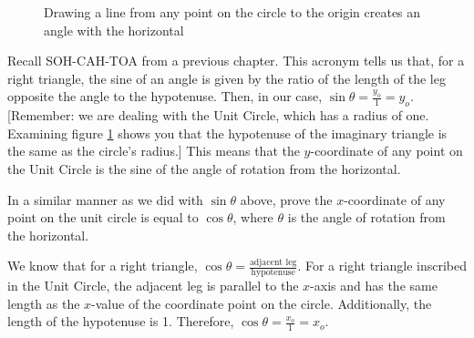 \begin{figure}[htbp]
    \centering
    \caption{Drawing a line from any point on the circle to the origin creates 
    an angle with the horizontal}
    \label{fig:unit_cicle_zoom}
\end{figure}

Recall SOH-CAH-TOA from a previous chapter. This acronym tells us that, for a 
right triangle, the sine of an angle is given by the ratio of the length of the
leg opposite the angle to the hypotenuse. Then, in our case, $\sin{\theta} = 
\frac{y_o}{1} = y_o$. [Remember: we are dealing with the Unit Circle, which has
a radius of one. Examining figure \ref{fig:unit_cicle_zoom} shows you that the 
hypotenuse of the imaginary triangle is the same as the circle's radius.] This 
means that the $y$-coordinate of any point on the Unit Circle is the sine of 
the angle of rotation from the horizontal. 

\begin{Exercise}[label = sine]
In a similar manner as we did with $\sin{\theta}$ above, prove the 
$x$-coordinate of any point on the unit circle is equal to $\cos{\theta}$, 
where $\theta$ is the angle of rotation from the horizontal. 
\vspace{20mm}
\end{Exercise}

\begin{Answer}[ref = sine]
We know that for a right triangle, $\cos{\theta} = \frac{\text{adjacent leg}}{
\text{hypotenuse}}$. For a right triangle inscribed in the Unit Circle, the 
adjacent leg is parallel to the $x$-axis and has the same length as the 
$x$-value of the coordinate point on the circle. Additionally, the length of 
the hypotenuse is 1. Therefore, $\cos{\theta} = \frac{x_o}{1} = x_o$. 
\end{Answer}

